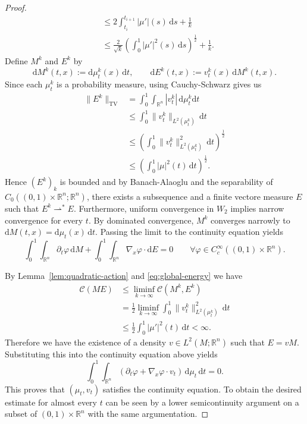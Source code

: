 \begin{proof}
\begin{align*}
					   &\leq 2\int_{t_i}^{t_{i+1}}|\mu'|(s)\,\mathrm ds+\frac{1}{k}\\
					   &\leq \frac{2}{\sqrt{k}}\left(\int_0^1|\mu'|^2(s)\,\mathrm ds\right)^{\frac{1}{2}} +\frac{1}{k}.
\end{align*}
Define $M^k$ and $E^k$ by 
$$
\mathrm{d} M^k(t,x) := \mathrm d\mu_t^k(x)\,\mathrm dt,\qquad \mathrm dE^k(t,x):=v_t^k(x)\,\mathrm dM^k(t,x).
$$
Since each $\mu_t^k$ is a probability measure, using Cauchy-Schwarz gives us
\begin{align*}
	\lVert E^k\rVert_{\mathrm{TV}} &=\int_0^1\int_{\mathbb{R}^n}|v_t^k|\,\mathrm d\mu_t^k\mathrm dt\\
								   &\leq\int_0^1 \lVert v_t^k\rVert_{L^2(\mu_t^k)}\,\mathrm dt\\
								   &\leq \left(\int_0^1 \lVert v_t^k\rVert_{L^2(\mu_t^k)}^2\,\mathrm dt\right)^{\frac{1}{2}}\\
								   &\leq\left(\int_0^1|\mu|^2(t)\,\mathrm dt\right)^{\frac{1}{2}}.
\end{align*}
Hence $(E^k)_k$ is bounded and by Banach-Alaoglu 
and the separability of $C_0((0,1)\times \mathbb{R}^n;\mathbb{R}^n)$, there exists a subsequence and a finite vectore measure $E$ such that $E^k\rightharpoonup^* E$. Furthermore, uniform convergence in $W_2$ implies narrow convergence for every $t$. By dominated convergence, $M^k$ converges narrowly to $\mathrm dM(t,x)=\mathrm d\mu_t(x)\,\mathrm dt$. Passing the limit to the continuity equation yields
$$
\int_0^1\int_{\mathbb{R}^n}\partial_t\varphi\,\mathrm dM + \int_0^1\int_{\mathbb{R}^n} \nabla_x\varphi\cdot\mathrm dE=0 \qquad \forall\varphi \in C_c^\infty((0,1)\times \mathbb{R}^n).
$$

By Lemma~\ref{lem:quadratic-action} and \eqref{eq:global-energy} we have
\begin{align*}
	\mathcal{C}(ME) &\leq\liminf_{k\to\infty}\mathcal{C}(M^k,E^k)\\
					&=\frac{1}{2}\liminf_{k\to\infty}\int_0^1 \lVert v_t^k\rVert_{L^2(\mu_t^k)}^2\,\mathrm dt\\
					&\leq\frac{1}{2}\int_0^1 |\mu'|^2(t)\,\mathrm dt<\infty.
\end{align*}
Therefore we have the existence of a density $v\in L^2(M; \mathbb{R}^n)$ such that $E=vM$. Substituting this into the continuity equation above yields
$$
\int_0^1\int_{\mathbb{R}^n} (\partial_t\varphi+\nabla_x\varphi\cdot v_t)\,\mathrm d\mu_t\,\mathrm dt = 0.
$$
This proves that $(\mu_t,v_t)$ satisfies the continuity equation. To obtain the desired estimate for almost every $t$ can be seen by a lower semicontinuity argument on a subset of $(0,1)\times \mathbb{R}^n$ with the same argumentation. 
\end{proof}
